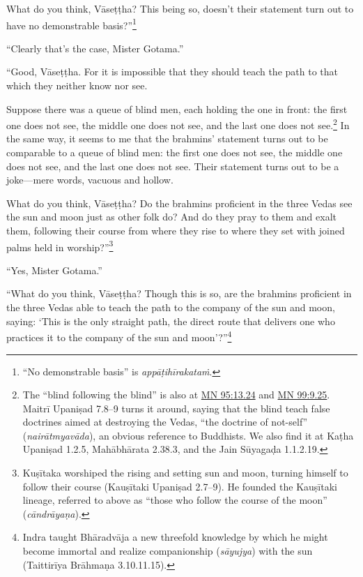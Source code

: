 \documentclass[12pt,openany]{book}%
\begin{document}
What do you think, \textsanskrit{Vāseṭṭha}? This being so, doesn’t their statement turn out to have no demonstrable basis?”\footnote{“No demonstrable basis” is \textit{\textsanskrit{appāṭihīrakataṁ}}. } 

“Clearly that’s the case, Mister Gotama.” 

“Good, \textsanskrit{Vāseṭṭha}. For it is impossible that they should teach the path to that which they neither know nor see. 

Suppose there was a queue of blind men, each holding the one in front: the first one does not see, the middle one does not see, and the last one does not see.\footnote{The “blind following the blind” is also at \href{https://suttacentral.net/mn95/en/sujato\#13.24}{MN 95:13.24} and \href{https://suttacentral.net/mn99/en/sujato\#9.25}{MN 99:9.25}. \textsanskrit{Maitrī} \textsanskrit{Upaniṣad} 7.8–9 turns it around, saying that the blind teach false doctrines aimed at destroying the Vedas, “the doctrine of not-self” (\textit{\textsanskrit{nairātmyavāda}}), an obvious reference to Buddhists. We also find it at \textsanskrit{Kaṭha} \textsanskrit{Upaniṣad} 1.2.5, \textsanskrit{Mahābhārata} 2.38.3, and the Jain \textsanskrit{Sūyagaḍa} 1.1.2.19. } In the same way, it seems to me that the brahmins’ statement turns out to be comparable to a queue of blind men: the first one does not see, the middle one does not see, and the last one does not see. Their statement turns out to be a joke—mere words, vacuous and hollow. 

What do you think, \textsanskrit{Vāseṭṭha}? Do the brahmins proficient in the three Vedas see the sun and moon just as other folk do? And do they pray to them and exalt them, following their course from where they rise to where they set with joined palms held in worship?”\footnote{\textsanskrit{Kuṣītaka} worshiped the rising and setting sun and moon, turning himself to follow their course (\textsanskrit{Kauṣītaki} \textsanskrit{Upaniṣad} 2.7–9). He founded the \textsanskrit{Kauṣītaki} lineage, referred to above as “those who follow the course of the moon” (\textit{\textsanskrit{cāndrāyaṇa}}). } 

“Yes, Mister Gotama.” 

“What do you think, \textsanskrit{Vāseṭṭha}? Though this is so, are the brahmins proficient in the three Vedas able to teach the path to the company of the sun and moon, saying: ‘This is the only straight path, the direct route that delivers one who practices it to the company of the sun and moon’?”\footnote{Indra taught \textsanskrit{Bhāradvāja} a new threefold knowledge by which he might become immortal and realize companionship (\textit{\textsanskrit{sāyujya}}) with the sun (\textsanskrit{Taittirīya} \textsanskrit{Brāhmaṇa} 3.10.11.15). } 
\end{document}
